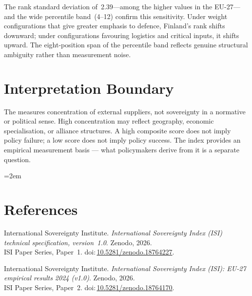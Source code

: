 \documentclass[12pt,a4paper]{article}
\begin{document}
The rank standard deviation of~2.39---among the higher values in the EU-27---and the wide percentile band~(4--12) confirm this sensitivity.  Under weight configurations that give greater emphasis to defence, Finland's rank shifts downward; under configurations favouring logistics and critical inputs, it shifts upward.  The eight-position span of the percentile band reflects genuine structural ambiguity rather than measurement noise.


\section{Interpretation Boundary}
\label{sec:interpretation}

The \ISI measures concentration of external suppliers, not sovereignty in a normative or political sense.  High concentration may reflect geography, economic specialisation, or alliance structures.  A high composite score does not imply policy failure; a low score does not imply policy success.  The index provides an empirical measurement basis --- what policymakers derive from it is a separate question.


\clearpage
\vspace*{1.5cm}

\begingroup\emergencystretch=2em
\section*{References}

\begin{enumerate}[label={[\arabic*]},leftmargin=2em,itemsep=6pt]
\item International Sovereignty Institute.
  \textit{International Sovereignty Index (ISI) technical specification, version~1.0}.
  Zenodo, 2026.\\ISI Paper Series, Paper~1.
  doi:\,\href{https://doi.org/10.5281/zenodo.18764227}{10.5281/zenodo.18764227}.

\item International Sovereignty Institute.
  \textit{International Sovereignty Index (ISI): EU-27 empirical results 2024 (v1.0)}.
  Zenodo, 2026.\\ISI Paper Series, Paper~2.
  doi:\,\href{https://doi.org/10.5281/zenodo.18764170}{10.5281/zenodo.18764170}.
\end{enumerate}
\endgroup
\end{document}
